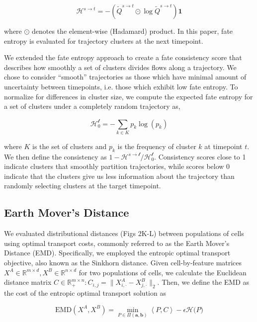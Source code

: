 \[\mathcal{H}^{s \rightarrow t} = - \left( {\widetilde{Q}}^{s \rightarrow t} \odot \mathrm{\log}{\widetilde{Q}}^{s \rightarrow t} \right)\mathbf{1}\]

where \(\odot\) denotes the element-wise (Hadamard) product. In this paper, fate entropy is evaluated for trajectory clusters at the next timepoint.

We extended the fate entropy approach to create a fate consistency score that describes how smoothly a set of clusters divides flows along a trajectory. We chose to consider ``smooth'' trajectories as those which have minimal amount of uncertainty between timepoints, i.e. those which exhibit low fate entropy. To normalize for differences in cluster size, we compute the expected fate entropy for a set of clusters under a completely random trajectory as,

\[\mathcal{H}_{0}^{\mathcal{t}} = - \sum_{k \in K}^{}{p_{k}\log\left( p_{k} \right)}\]

where \(K\) is the set of clusters and \(p_{k}\) is the frequency of cluster \(k\) at timepoint \(t\). We then define the consistency as \(1 - \mathcal{H}^{s \rightarrow \mathcal{t}}/\mathcal{H}_{0}^{\mathcal{t}}\). Consistency scores close to 1 indicate clusters that smoothly partition trajectories, while scores below 0 indicate that the clusters give us less information about the trajectory than randomly selecting clusters at the target timepoint.

\subsection{Earth Mover's Distance}

We evaluated distributional distances (Figs 2K-L) between populations of cells using optimal transport costs, commonly referred to as the Earth Mover's Distance (EMD). Specifically, we employed the entropic optimal transport objective, also known as the Sinkhorn distance. Given cell-by-feature matrices \(X^{A} \in \mathbb{R}^{m \times d},X^{B} \in \mathbb{R}^{n \times d}\) for two populations of cells, we calculate the Euclidean distance matrix \(C \in \mathbb{R}_{+}^{m \times n}:C_{i,j} = \left. \parallel X_{i, \cdot}^{A} - X_{j, \cdot}^{B} \right.\parallel_{2}\). Then, we define the EMD as the cost of the entropic optimal transport solution as

\[\mathrm{\text{EMD}}(X^{A},X^{B}) = \underset{P \in \Pi(\mathbf{a},\mathbf{b})}{\mathrm{\min}}\left\langle P,C \right\rangle - \epsilon\mathcal{H(}P)\]

